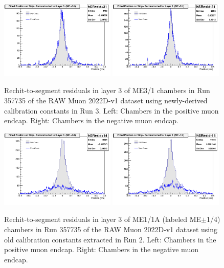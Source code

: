\begin{figure}[H]
    \centering
    {\includegraphics[width=0.49\textwidth]{Images/DetectorPerformance/run_10000012_oldME11A/hSResidplus31.png}}
    {\includegraphics[width=0.49\textwidth]{Images/DetectorPerformance/run_10000012_oldME11A/hSResidminus31.png}}
    \caption{Rechit-to-segment residuals in layer 3 of ME3/1 chambers in Run 357735 of the RAW Muon 2022D-v1 dataset using newly-derived calibration constants in Run 3. Left: Chambers in the positive muon endcap. Right: Chambers in the negative muon endcap.}
    \label{fig:CalibVal2}
\end{figure}

\begin{figure}[H]
    \centering
    {\includegraphics[width=0.49\textwidth]{Images/DetectorPerformance/run_10000012_oldME11A/hSResidplus14.png}}
    {\includegraphics[width=0.49\textwidth]{Images/DetectorPerformance/run_10000012_oldME11A/hSResidminus14.png}}
    \caption{Rechit-to-segment residuals in layer 3 of ME1/1A (labeled ME$\pm$1/4) chambers in Run 357735 of the RAW Muon 2022D-v1 dataset using old calibration constants extracted in Run 2. Left: Chambers in the positive muon endcap. Right: Chambers in the negative muon endcap.}
    \label{fig:CalibVal2ME11A}
\end{figure}

